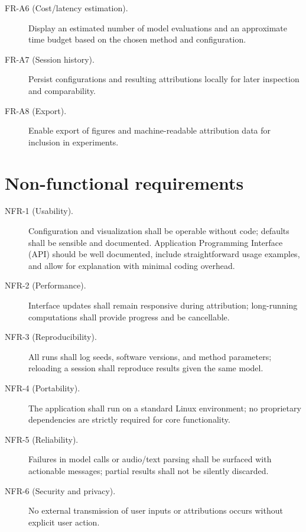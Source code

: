 \begin{appendices}
\begin{description}
    \item[FR-A6 (Cost/latency estimation).] Display an estimated number of model evaluations and an approximate time budget based on the chosen method and configuration.

    \item[FR-A7 (Session history).] Persist configurations and resulting attributions locally for later inspection and comparability.

    \item[FR-A8 (Export).] Enable export of figures and machine-readable attribution data for inclusion in experiments.

    \end{description}

    \section{Non-functional requirements}
    \label{subsec:requirements__nfr}

    \begin{description}
    \item[NFR-1 (Usability).] Configuration and visualization shall be operable without code; defaults shall be sensible and documented. Application Programming Interface (API) should be well documented, include straightforward usage examples, and allow for explanation with minimal coding overhead.

    \item[NFR-2 (Performance).] Interface updates shall remain responsive during attribution; long-running computations shall provide progress and be cancellable.

    \item[NFR-3 (Reproducibility).] All runs shall log seeds, software versions, and method parameters; reloading a session shall reproduce results given the same model.

    \item[NFR-4 (Portability).] The application shall run on a standard Linux environment; no proprietary dependencies are strictly required for core functionality.

    \item[NFR-5 (Reliability).] Failures in model calls or audio/text parsing shall be surfaced with actionable messages; partial results shall not be silently discarded.

    \item[NFR-6 (Security and privacy).] No external transmission of user inputs or attributions occurs without explicit user action.


\end{description}
\end{appendices}
